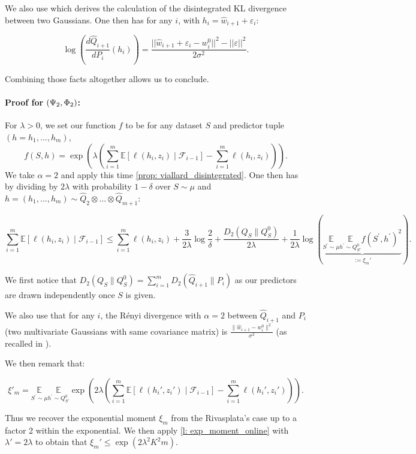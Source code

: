 \begin{noaddcontents}
We also use \cite[Lemma 11]{viallard2023general} which derives the calculation of the disintegrated KL divergence between two Gaussians. One then has for any $i$, with $h_i= \hat{w}_{i+1} + \varepsilon_i$:

\[ \log\left(\frac{d\hat{Q}_{i+1}}{dP_i}(h_i)\right) = \frac{||\hat{w}_{i+1} + \varepsilon_i- w_i^0||^2 - ||\varepsilon||^2}{2\sigma^2}. \]

Combining those facts altogether allows us to conclude.


\paragraph{Proof for  $(\Psi_{\normalfont2},\Phi_{\normalfont2})$:}

For $\lambda>0$, we set our function $f$ to be for any dataset $S$ and predictor tuple $(h=h_1,...,h_m)$,
\[f(S,h) = \exp\left(\lambda \left(\sum_{i=1}^m \mathbb{E}\left[\ell(h_i,z_i)\mid \mathcal{F}_{i-1}\right]- \sum_{i=1}^m \ell(h_i,z_i) \right) \right).\]
We take $\alpha=2$ and apply this time \cref{prop: viallard_disintegrated}.
One then has by dividing by $2\lambda$ with probability $1-\delta$ over $S\sim \mu$ and $h=(h_1,...,h_m)\sim \hat{Q}_2\otimes ... \otimes \hat{Q}_{m+1}$:

\[\sum_{i=1}^m  \mathbb{E}[\ell(h_i,z_i) \mid \mathcal{F}_{i-1}]   \leq \sum_{i=1}^m  \ell(h_i,z_i)+   \frac{3}{2\lambda}\log \frac{2}{\delta}+\frac{D_{2}\left(Q_{S} \| Q_S^0\right)}{2\lambda}+ \frac{1}{2\lambda}
\log \left(\underbrace{\underset{S^{\prime} \sim \mu}{\mathbb{E}} \underset{h^{\prime} \sim Q_{S'}^0}{\mathbb{E}}
f\left(S^{\prime},h^{\prime}\right)^{2}}_{:= \xi_m'}\right). \]

We first notice that $D_{2}\left(Q_{S} \| Q_S^0\right) = \sum_{i=1}^m D_2(\hat{Q}_{i+1}\| P_i)$ as our predictors are drawn independently once $S$ is given.

We also use that for any $i$, the Rényi divergence with $\alpha=2$ between $\hat{Q}_{i+1}$ and $P_i$ (two multivariate Gaussians with same covariance matrix) is $\frac{\|\hat{w}_{i+1}- w_i^0\|^2}{\sigma^2}$ (as recalled in \cite{gil2013renyi}).

We then remark that:

\[ \xi'_m = \underset{S^{\prime} \sim \mu}{\mathbb{E}} \underset{h^{\prime} \sim Q_{S'}^0}{\mathbb{E}}
\exp\left(2\lambda \left(\sum_{i=1}^m \mathbb{E}\left[\ell(h_i',z_i')\mid \mathcal{F}_{i-1}\right]- \sum_{i=1}^m \ell(h_i',z_i') \right)\right).  \]

Thus we recover the exponential moment $\xi_m$ from the Rivasplata's case up to a factor 2 within the exponential. We then apply \cref{l: exp_moment_online} with $\lambda'= 2\lambda$ to obtain that $\xi_m'\leq \exp\left(  2\lambda^2K^2m \right)$.



\end{noaddcontents}

